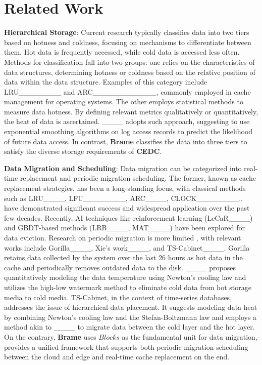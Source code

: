 \section{Related Work}
\label{sec:rel}

\parindent=0pt
\textbf{Hierarchical Storage}: Current research typically classifies data into two tiers based on hotness and coldness, focusing on mechanisms to differentiate between them. Hot data is frequently accessed, while cold data is accessed less often. Methods for classification fall into two groups: one relies on the characteristics of data structures, determining hotness or coldness based on the relative position of data within the data structure. Examples of this category include LRU________ and ARC____________, commonly employed in cache management for operating systems. The other employs statistical methods to measure data hotness. By defining relevant metrics qualitatively or quantitatively, the heat of data is ascertained. ____ adopts such approach, suggesting to use exponential smoothing algorithms on log access records to predict the likelihood of future data access.
In contrast, \textbf{Brame} classifies the data into three tiers to satisfy the diverse storage requirements of \textbf{CEDC}.

\parindent=0pt
\textbf{Data Migration and Scheduling}: Data migration can be categorized into real-time replacement and periodic migration scheduling. The former, known as cache replacement strategies, has been a long-standing focus, with classical methods such as LRU____, LFU________, ARC____, CLOCK________., have demonstrated significant success and widespread application over the past few decades. Recently, AI techniques like reinforcement learning (LeCaR____) and GBDT-based methods (LRB____, MAT____) have been explored for data eviction. Research on periodic migration is more limited , with relevant works include Gorilla____, Xie's work____, and TS-Cabinet____. Gorilla retains data collected by the system over the last 26 hours as hot data in the cache and periodically removes outdated data to the disk. ____ proposes quantitatively modeling the data temperature using Newton's cooling law and utilizes the high-low watermark method to eliminate cold data from hot storage media to cold media. TS-Cabinet, in the context of time-series databases, addresses the issue of hierarchical data placement. It suggests modeling data heat by combining Newton's cooling law and the Stefan-Boltzmann law and employs a method akin to ____ to migrate data between the cold layer and the hot layer.
On the contrary, \textbf{Brame} uses $Blocks$ as the fundamental unit for data migration, provides a unified framework that supports both periodic migration scheduling between the cloud and edge and real-time cache replacement on the end.

